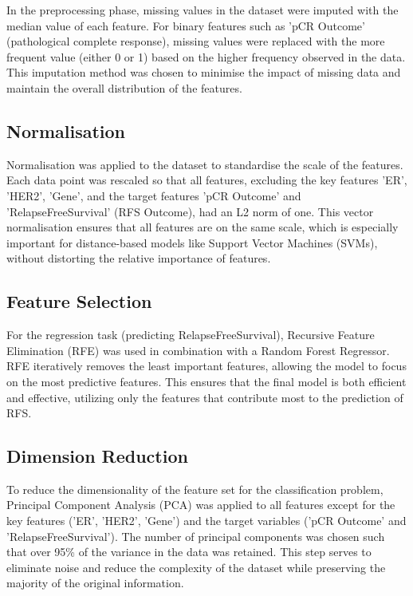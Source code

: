 \documentclass{article}
\begin{document}
In the preprocessing phase, missing values in the dataset were imputed with the median value of each feature. For binary features such as 'pCR Outcome' (pathological complete response), missing values were replaced with the more frequent value (either 0 or 1) based on the higher frequency observed in the data. This imputation method was chosen to minimise the impact of missing data and maintain the overall distribution of the features.

\subsection{Normalisation}

Normalisation was applied to the dataset to standardise the scale of the features. Each data point was rescaled so that all features, excluding the key features 'ER', 'HER2', 'Gene', and the target features 'pCR Outcome' and 'RelapseFreeSurvival' (RFS Outcome), had an L2 norm of one. This vector normalisation ensures that all features are on the same scale, which is especially important for distance-based models like Support Vector Machines (SVMs), without distorting the relative importance of features.

\subsection{Feature Selection}

For the regression task (predicting RelapseFreeSurvival), Recursive Feature Elimination (RFE) was used in combination with a Random Forest Regressor. RFE iteratively removes the least important features, allowing the model to focus on the most predictive features. This ensures that the final model is both efficient and effective, utilizing only the features that contribute most to the prediction of RFS.

\subsection{Dimension Reduction}

To reduce the dimensionality of the feature set for the classification problem, Principal Component Analysis (PCA) was applied to all features except for the key features ('ER', 'HER2', 'Gene') and the target variables ('pCR Outcome' and 'RelapseFreeSurvival'). The number of principal components was chosen such that over 95\% of the variance in the data was retained. This step serves to eliminate noise and reduce the complexity of the dataset while preserving the majority of the original information.
\end{document}
